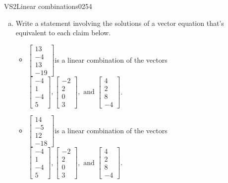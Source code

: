 \begin{exercise}{VS2}{Linear combinations}{0254} 
\begin{exerciseStatement} 

\begin{enumerate}[(a)]
\item  

 Write a statement involving the solutions of a vector equation that's equivalent to each claim below. 

 

\begin{itemize}
\item  

 \(\left[\begin{array}{c}
13 \\
-4 \\
13 \\
-19
\end{array}\right]\)is a linear combination of the vectors \(\left[\begin{array}{c}
-4 \\
1 \\
-4 \\
5
\end{array}\right] , \left[\begin{array}{c}
-2 \\
2 \\
0 \\
3
\end{array}\right] , \text{ and } \left[\begin{array}{c}
4 \\
2 \\
8 \\
-4
\end{array}\right]\). 

 
\item  

 \(\left[\begin{array}{c}
14 \\
-5 \\
12 \\
-18
\end{array}\right]\)is a linear combination of the vectors \(\left[\begin{array}{c}
-4 \\
1 \\
-4 \\
5
\end{array}\right] , \left[\begin{array}{c}
-2 \\
2 \\
0 \\
3
\end{array}\right] , \text{ and } \left[\begin{array}{c}
4 \\
2 \\
8 \\
-4
\end{array}\right]\). 


\end{itemize}
\end{enumerate}
\end{exerciseStatement}
\end{exercise}

